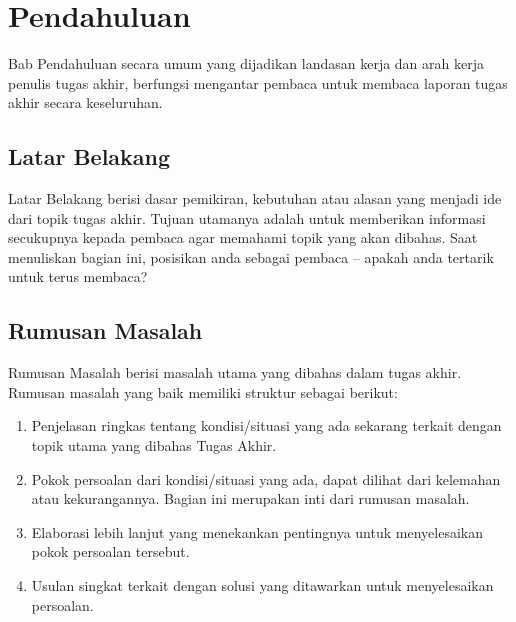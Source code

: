 %
%
%
%
%

\chapter{Pendahuluan}

Bab Pendahuluan secara umum yang dijadikan landasan kerja dan arah kerja penulis tugas akhir, berfungsi mengantar pembaca untuk membaca laporan tugas akhir secara keseluruhan.

\section{Latar Belakang}

Latar Belakang berisi dasar pemikiran, kebutuhan atau alasan yang menjadi ide dari topik tugas akhir. Tujuan utamanya adalah untuk memberikan informasi secukupnya kepada pembaca agar memahami topik yang akan dibahas.  Saat menuliskan bagian ini, posisikan anda sebagai pembaca – apakah anda tertarik untuk terus membaca?

\blindtext

\section{Rumusan Masalah}

Rumusan Masalah berisi masalah utama yang dibahas dalam tugas akhir. Rumusan masalah yang baik memiliki struktur sebagai berikut:

\begin{enumerate}
    \item Penjelasan ringkas tentang kondisi/situasi yang ada sekarang terkait dengan topik utama yang dibahas Tugas Akhir.
    \item Pokok persoalan dari kondisi/situasi yang ada, dapat dilihat dari kelemahan atau kekurangannya. Bagian ini merupakan inti dari rumusan masalah.
    \item Elaborasi lebih lanjut yang menekankan pentingnya untuk menyelesaikan pokok persoalan tersebut.
    \item Usulan singkat terkait dengan solusi yang ditawarkan untuk menyelesaikan persoalan.
\end{enumerate}

